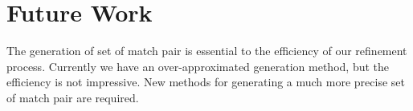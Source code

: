 \section{Future Work}
The generation of set of match pair is essential to the efficiency of our refinement process. Currently we have an over-approximated generation method, but the efficiency is not impressive. New methods for generating a much more precise set of match pair are required. 